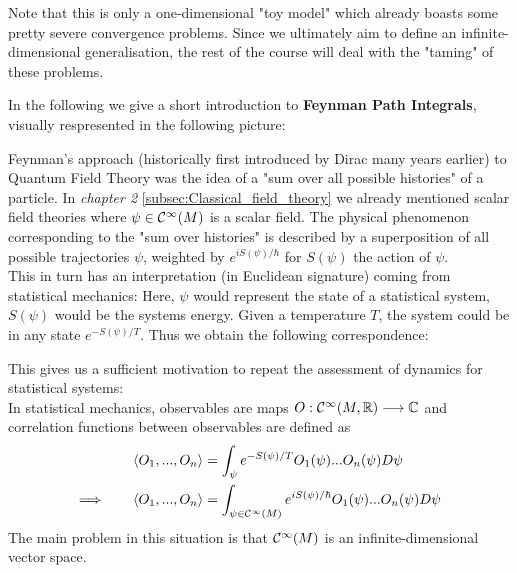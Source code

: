 \begin{example}
  Note that this is only a one-dimensional "toy model" which already boasts some pretty severe convergence problems. Since we ultimately aim to define an infinite-dimensional generalisation, the rest of the course will deal with the "taming" of these problems.
\end{example}

In the following we give a short introduction to \textbf{Feynman Path Integrals}, visually respresented in the following picture:
\begin{center}
\end{center}
Feynman's approach (historically first introduced by Dirac many years earlier) to Quantum Field Theory was the idea of a "sum over all possible histories" of a particle. In \emph{chapter 2} \ref{subsec:Classical_field_theory} we already mentioned scalar field theories where $\psi \in\mathcal{C}^{\infty}(M)$ is a scalar field. The physical phenomenon corresponding to the "sum over histories" is described by a superposition of all possible trajectories $\psi$, weighted by $e^{iS(\psi) / \hbar}$ for $S(\psi)$ the action of $\psi$.\\

This in turn has an interpretation (in Euclidean signature) coming from statistical mechanics: Here, $\psi$ would represent the state of a statistical system, $S(\psi)$ would be the systems energy. Given a temperature $T$, the system could be in any state $e^{-S(\psi)/ T}$. Thus we obtain the following correspondence:
\begin{center}
\end{center}
This gives us a sufficient motivation to repeat the assessment of dynamics for statistical systems:\\

In statistical mechanics, observables are maps $O: \mathcal{C}^{\infty}(M,\mathbb{R}) \longrightarrow \mathbb{C}$ and correlation functions between observables are defined as
\begin{align}
  \langle O_1, ..., O_n \rangle &= \int_\psi e^{-S(\psi)/T} O_1(\psi) ... O_n(\psi) D\psi\\
  \Longrightarrow \quad \quad \langle O_1, ..., O_n \rangle &= \int_{\psi \in \mathcal{C}^{\infty}(M)} e^{i S(\psi)/\hbar} O_1(\psi) ... O_n(\psi) D\psi
\end{align}
The main problem in this situation is that $\mathcal{C}^{\infty}(M)$ is an infinite-dimensional vector space.

